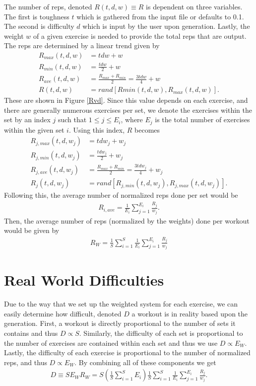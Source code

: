 The number of reps, denoted $R(t,d,w) \equiv R$ is dependent on three variables. The first is toughness $t$ which is gathered from the input file or defaults to 0.1. The second is difficulty $d$ which is input by the user upon generation. Lastly, the weight $w$ of a given exercise is needed to provide the total reps that are output. The reps are determined by a linear trend given by
\begin{align}
	R_{max}(t,d,w) &= tdw+w \\
	R_{min}(t,d,w) &= \frac{tdw}{2}+w \\
	R_{ave}(t,d,w) &= \frac{R_{max}+R_{min}}{2} = \frac{3tdw}{4}+w \\
	R(t,d,w) &= rand[R{min}(t,d,w),R_{max}(t,d,w)].
\end{align}
These are shown in Figure \ref{Rvd}. Since this value depends on each exercise, and there are generally numerous exercises per set, we denote the exercises within the set by an index $j$ such that $1 \leq j \leq E_i$, where $E_j$ is the total number of exercises within the given set $i$. Using this index, $R$ becomes
\begin{align}
	R_{j,max}(t,d,w_j) &= tdw_j+w_j \\
	R_{j,min}(t,d,w_j) &= \frac{tdw_j}{2}+w_j \\
	R_{j,ave}(t,d,w_j) &= \frac{R_{max}+R_{min}}{2} = \frac{3tdw_j}{4}+w_j \\
	R_j(t,d,w_j) &= rand[R_{j,min}(t,d,w_j),R_{j,max}(t,d,w_j)].
\end{align}
Following this, the average number of normalized reps done per set would be
\begin{align}
	R_{i,ave} = \frac{1}{E_i}\sum_{j=1}^{E_i}\frac{R_j}{w_j}.
\end{align}
Then, the average number of reps (normalized by the weights) done per workout would be given by
\begin{align}
	R_{W} = \frac{1}{S}\sum_{i=1}^{S}\frac{1}{E_i}\sum_{j=1}^{E_i}\frac{R_j}{w_j}
\end{align}

\section{Real World Difficulties} 

Due to the way that we set up the weighted system for each exercise, we can easily determine how difficult, denoted $D$ a workout is in reality based upon the generation. First, a workout is directly proportional to the number of sets it contains and thus $D \propto S$. Similarly, the difficulty of each set is proportional to the number of exercises are contained within each set and thus we use $D \propto E_{W}$. Lastly, the difficulty of each exercise is proportional to the number of normalized reps, and thus $D \propto E_{W}$. By combining all of these components we get
\begin{align}
	D \equiv S E_{W} R_{W} = S \left(\frac{1}{S}\sum_{i=1}^{S}E_i \right)\frac{1}{S}\sum_{i=1}^{S}\frac{1}{E_i}\sum_{j=1}^{E_i}\frac{R_j}{w_j}.
\end{align}

